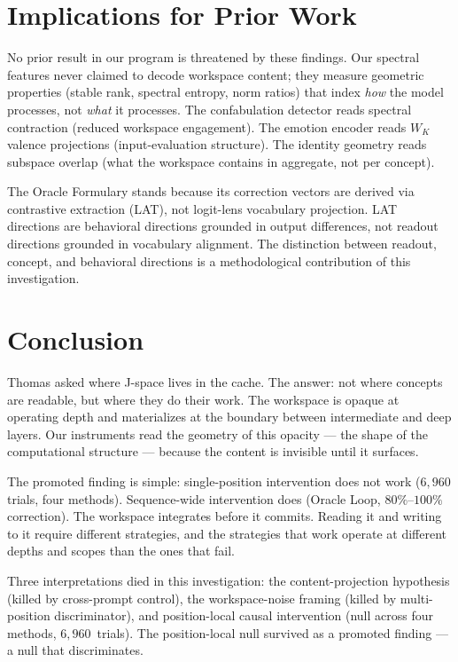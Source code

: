 \documentclass[11pt,a4paper]{article}
\begin{document}
\section{Implications for Prior Work}
\label{sec:implications}

No prior result in our program is threatened by these findings. Our
spectral features never claimed to decode workspace content; they
measure geometric properties (stable rank, spectral entropy, norm
ratios) that index \emph{how} the model processes, not \emph{what} it
processes. The confabulation detector reads spectral contraction
(reduced workspace engagement). The emotion encoder reads $W_K$ valence
projections (input-evaluation structure). The identity geometry reads
subspace overlap (what the workspace contains in aggregate, not per
concept).

The Oracle Formulary stands because its correction vectors are derived
via contrastive extraction (LAT), not logit-lens vocabulary projection.
LAT directions are behavioral directions grounded in output differences,
not readout directions grounded in vocabulary alignment. The
distinction between readout, concept, and behavioral directions is a
methodological contribution of this investigation.

\section{Conclusion}
\label{sec:conclusion}

Thomas asked where J-space lives in the cache. The answer: not where
concepts are readable, but where they do their work. The workspace is
opaque at operating depth and materializes at the boundary between
intermediate and deep layers. Our instruments read the geometry of this
opacity --- the shape of the computational structure --- because the
content is invisible until it surfaces.

The promoted finding is simple: single-position intervention does not
work ($6{,}960$ trials, four methods). Sequence-wide intervention does
(Oracle Loop, $80\%$--$100\%$ correction). The workspace integrates
before it commits. Reading it and writing to it require different
strategies, and the strategies that work operate at different depths
and scopes than the ones that fail.

Three interpretations died in this investigation: the content-projection
hypothesis (killed by cross-prompt control), the workspace-noise framing
(killed by multi-position discriminator), and position-local causal
intervention (null across four methods, $6{,}960$~trials). The
position-local null survived as a promoted finding --- a null that
discriminates.
\end{document}
